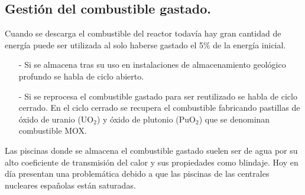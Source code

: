 \subsection{Gestión del combustible gastado.}
Cuando se descarga el combustible del reactor todavía hay gran cantidad de energía puede ser utilizada al solo haberse gastado el 5\% de la energía inicial.
\begin{itemize}
	\item [-] Si se almacena tras su uso en instalaciones de almacenamiento geológico profundo se habla de ciclo abierto.
	\item [-] Si se reprocesa el combustible gastado para ser reutilizado se habla de ciclo cerrado. En el ciclo cerrado se recupera el combustible fabricando pastillas de óxido de uranio (UO$_2$) y óxido de plutonio (PuO$_2$) que se denominan combustible MOX.
\end{itemize}
Las piscinas donde se almacena el combustible gastado suelen ser de agua por su alto coeficiente de transmisión del calor y sus propiedades como blindaje. Hoy en día presentan una problemática debido a que las piscinas de las centrales nucleares españolas están saturadas.
